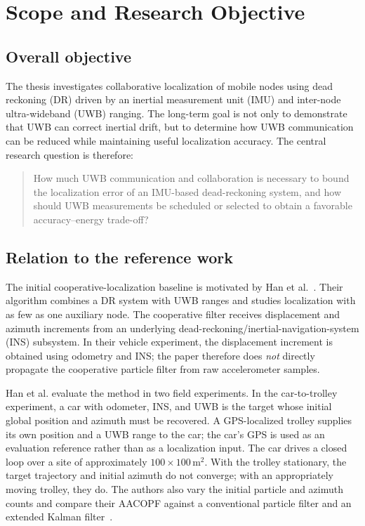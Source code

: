 \chapter{Scope and Research Objective}
\section{Overall objective}
The thesis investigates collaborative localization of mobile nodes using dead reckoning (DR) driven by an inertial measurement unit (IMU) and inter-node ultra-wideband (UWB) ranging. The long-term goal is not only to demonstrate that UWB can correct inertial drift, but to determine how UWB communication can be reduced while maintaining useful localization accuracy. The central research question is therefore:
\begin{quote}
How much UWB communication and collaboration is necessary to bound the localization error of an IMU-based dead-reckoning system, and how should UWB measurements be scheduled or selected to obtain a favorable accuracy--energy trade-off?
\end{quote}

\section{Relation to the reference work}
The initial cooperative-localization baseline is motivated by Han et al.~\cite{han2020cooperative}. Their algorithm combines a DR system with UWB ranges and studies localization with as few as one auxiliary node. The cooperative filter receives displacement and azimuth increments from an underlying dead-reckoning/inertial-navigation-system (INS) subsystem. In their vehicle experiment, the displacement increment is obtained using odometry and INS; the paper therefore does \emph{not} directly propagate the cooperative particle filter from raw accelerometer samples.

Han et al. evaluate the method in two field experiments. In the car-to-trolley experiment, a car with odometer, INS, and UWB is the target whose initial global position and azimuth must be recovered. A GPS-localized trolley supplies its own position and a UWB range to the car; the car's GPS is used as an evaluation reference rather than as a localization input. The car drives a closed loop over a site of approximately \(100\times100\,\mathrm{m}^2\). With the trolley stationary, the target trajectory and initial azimuth do not converge; with an appropriately moving trolley, they do. The authors also vary the initial particle and azimuth counts and compare their AACOPF against a conventional particle filter and an extended Kalman filter~\cite{han2020cooperative}.

